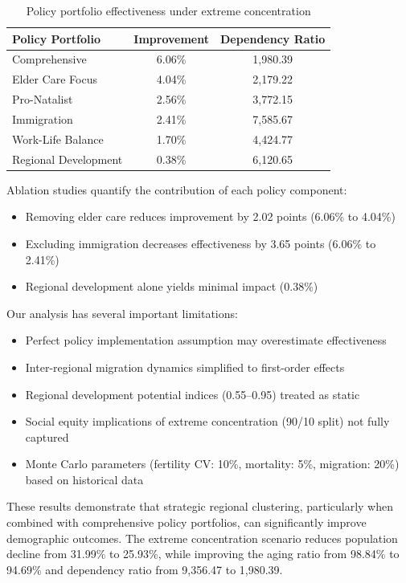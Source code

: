\documentclass{article} %
\begin{document}
\begin{table}[t]
\centering
\caption{Policy portfolio effectiveness under extreme concentration}
\begin{tabular}{lcc}
\toprule
Policy Portfolio & Improvement & Dependency Ratio \\
\midrule
Comprehensive & 6.06\% & 1,980.39 \\
Elder Care Focus & 4.04\% & 2,179.22 \\
Pro-Natalist & 2.56\% & 3,772.15 \\
Immigration & 2.41\% & 7,585.67 \\
Work-Life Balance & 1.70\% & 4,424.77 \\
Regional Development & 0.38\% & 6,120.65 \\
\bottomrule
\end{tabular}
\label{tab:policy_effectiveness}
\end{table}

Ablation studies quantify the contribution of each policy component:
\begin{itemize}
    \item Removing elder care reduces improvement by 2.02 points (6.06\% to 4.04\%)
    \item Excluding immigration decreases effectiveness by 3.65 points (6.06\% to 2.41\%)
    \item Regional development alone yields minimal impact (0.38\%)
\end{itemize}

Our analysis has several important limitations:
\begin{itemize}
    \item Perfect policy implementation assumption may overestimate effectiveness
    \item Inter-regional migration dynamics simplified to first-order effects
    \item Regional development potential indices (0.55--0.95) treated as static
    \item Social equity implications of extreme concentration (90/10 split) not fully captured
    \item Monte Carlo parameters (fertility CV: 10\%, mortality: 5\%, migration: 20\%) based on historical data
\end{itemize}

These results demonstrate that strategic regional clustering, particularly when combined with comprehensive policy portfolios, can significantly improve demographic outcomes. The extreme concentration scenario reduces population decline from 31.99\% to 25.93\%, while improving the aging ratio from 98.84\% to 94.69\% and dependency ratio from 9,356.47 to 1,980.39.
\end{document}
